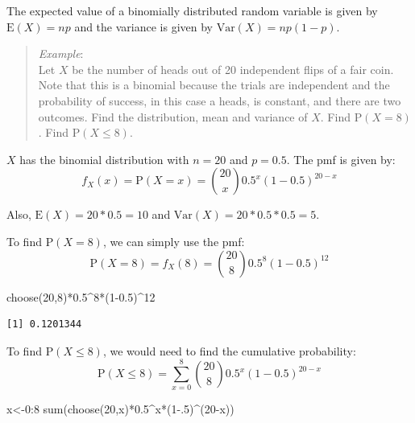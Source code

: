 \documentclass[
  letterpaper,
  DIV=11,
  numbers=noendperiod]{scrreprt}
\newenvironment{Shaded}{\begin{snugshade}}{\end{snugshade}}
\newcommand{\DecValTok}[1]{\textcolor[rgb]{0.68,0.00,0.00}{#1}}
\newcommand{\FloatTok}[1]{\textcolor[rgb]{0.68,0.00,0.00}{#1}}
\newcommand{\FunctionTok}[1]{\textcolor[rgb]{0.28,0.35,0.67}{#1}}
\newcommand{\NormalTok}[1]{\textcolor[rgb]{0.00,0.23,0.31}{#1}}
\newcommand{\OtherTok}[1]{\textcolor[rgb]{0.00,0.23,0.31}{#1}}
\newcommand{\SpecialCharTok}[1]{\textcolor[rgb]{0.37,0.37,0.37}{#1}}
\begin{document}
The expected value of a binomially distributed random variable is given
by \(\mbox{E}(X)=np\) and the variance is given by
\(\mbox{Var}(X)=np(1-p)\).

\begin{quote}
\emph{Example}:\\
Let \(X\) be the number of heads out of 20 independent flips of a fair
coin. Note that this is a binomial because the trials are independent
and the probability of success, in this case a heads, is constant, and
there are two outcomes. Find the distribution, mean and variance of
\(X\). Find \(\mbox{P}(X=8)\). Find \(\mbox{P}(X\leq 8)\).
\end{quote}

\(X\) has the binomial distribution with \(n=20\) and \(p=0.5\). The pmf
is given by: \[
f_X(x)=\mbox{P}(X=x)={20 \choose x}0.5^x (1-0.5)^{20-x}
\]

Also, \(\mbox{E}(X)=20*0.5=10\) and \(\mbox{Var}(X)=20*0.5*0.5=5\).

To find \(\mbox{P}(X=8)\), we can simply use the pmf: \[
\mbox{P}(X=8)=f_X(8)={20\choose 8}0.5^8 (1-0.5)^{12}
\]

\begin{Shaded}
\begin{Highlighting}[]
\FunctionTok{choose}\NormalTok{(}\DecValTok{20}\NormalTok{,}\DecValTok{8}\NormalTok{)}\SpecialCharTok{*}\FloatTok{0.5}\SpecialCharTok{\^{}}\DecValTok{8}\SpecialCharTok{*}\NormalTok{(}\DecValTok{1}\FloatTok{{-}0.5}\NormalTok{)}\SpecialCharTok{\^{}}\DecValTok{12}
\end{Highlighting}
\end{Shaded}

\begin{verbatim}
[1] 0.1201344
\end{verbatim}

To find \(\mbox{P}(X\leq 8)\), we would need to find the cumulative
probability: \[
\mbox{P}(X\leq 8)=\sum_{x=0}^8 {20\choose 8}0.5^x (1-0.5)^{20-x}
\]

\begin{Shaded}
\begin{Highlighting}[]
\NormalTok{x}\OtherTok{\textless{}{-}}\DecValTok{0}\SpecialCharTok{:}\DecValTok{8}
\FunctionTok{sum}\NormalTok{(}\FunctionTok{choose}\NormalTok{(}\DecValTok{20}\NormalTok{,x)}\SpecialCharTok{*}\FloatTok{0.5}\SpecialCharTok{\^{}}\NormalTok{x}\SpecialCharTok{*}\NormalTok{(}\DecValTok{1}\FloatTok{{-}.5}\NormalTok{)}\SpecialCharTok{\^{}}\NormalTok{(}\DecValTok{20}\SpecialCharTok{{-}}\NormalTok{x))}
\end{Highlighting}
\end{Shaded}
\end{document}
